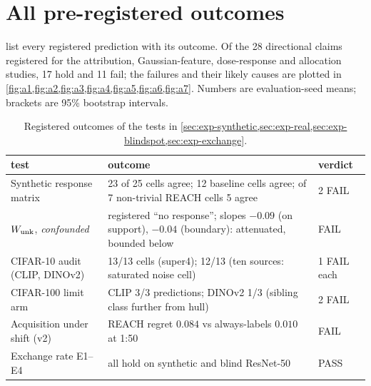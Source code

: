 \section{All pre-registered outcomes}
\label{app:outcomes}

 list every registered prediction with its outcome. Of the 28
directional claims registered for the attribution, Gaussian-feature, dose-response and allocation studies,
17 hold and 11 fail; the failures and their likely causes are plotted in
\cref{fig:a1,fig:a2,fig:a3,fig:a4,fig:a5,fig:a6,fig:a7}.
Numbers are evaluation-seed means; brackets are 95\% bootstrap intervals.

\begin{table}[!htbp]
\centering\footnotesize
\caption{Registered outcomes of the tests in \cref{sec:exp-synthetic,sec:exp-real,sec:exp-blindspot,sec:exp-exchange}.}
\label{tab:outcomes-early}
\begin{tabular}{p{3.4cm}p{8.2cm}p{1.6cm}}
\toprule
test & outcome & verdict \\
\midrule
Synthetic response matrix & 23 of 25 cells agree; 12 baseline cells agree; of 7 non-trivial REACH cells 5 agree & 2 FAIL \\
\quad $W_{\mathrm{unk}}$, \emph{confounded} & registered ``no response''; slopes $-0.09$ (on support), $-0.04$ (boundary): attenuated, bounded below & FAIL \\
CIFAR-10 audit (CLIP, DINOv2) & 13/13 cells (super4); 12/13 (ten sources: saturated noise cell) & 1 FAIL each \\
CIFAR-100 limit arm & CLIP 3/3 predictions; DINOv2 1/3 (sibling class further from hull) & 2 FAIL \\
Acquisition under shift (v2) & REACH regret $0.084$ vs always-labels $0.010$ at 1:50 & FAIL \\
Exchange rate E1--E4 & all hold on synthetic and blind ResNet-50 & PASS \\
\bottomrule
\end{tabular}
\end{table}

